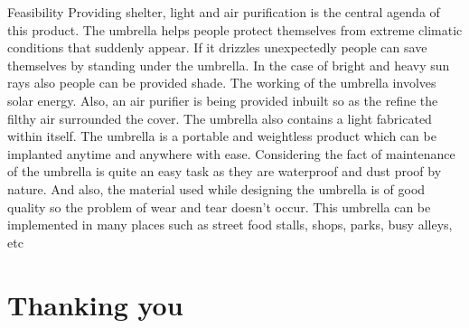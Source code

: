 \documentclass[10pt]{beamer}
\begin{document}
\begin{frame}[fragile]{Feasibility}
Providing shelter, light and air purification is the central agenda of this product. The umbrella helps people
protect themselves from extreme climatic conditions that suddenly appear. If it drizzles unexpectedly people
can save themselves by standing under the umbrella. In the case of bright and heavy sun rays also people can
be provided shade. The working of the umbrella involves solar energy. Also, an air purifier is being provided
inbuilt so as the refine the filthy air surrounded the cover. The umbrella also contains a light fabricated
within itself. The umbrella is a portable and weightless product which can be implanted anytime and
anywhere with ease. Considering the fact of maintenance of the umbrella is quite an easy task as they are
waterproof and dust proof by nature. And also, the material used while designing the umbrella is of good
quality so the problem of wear and tear doesn't occur. This umbrella can be implemented in many places
such as street food stalls, shops, parks, busy alleys, etc
\end{frame}
\section{Thanking you}
\end{document}
